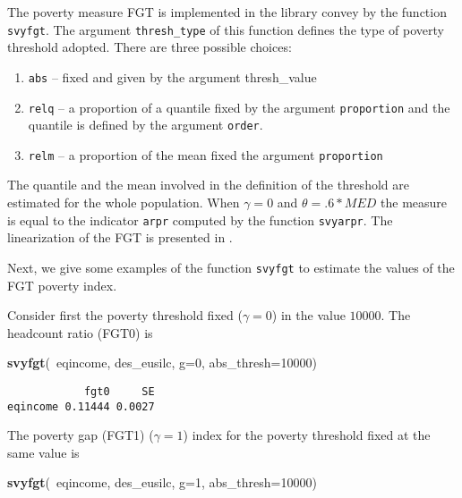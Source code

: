 \documentclass[]{book}
\newenvironment{Shaded}{\begin{snugshade}}{\end{snugshade}}
\newcommand{\KeywordTok}[1]{\textcolor[rgb]{0.13,0.29,0.53}{\textbf{{#1}}}}
\newcommand{\DataTypeTok}[1]{\textcolor[rgb]{0.13,0.29,0.53}{{#1}}}
\newcommand{\DecValTok}[1]{\textcolor[rgb]{0.00,0.00,0.81}{{#1}}}
\newcommand{\NormalTok}[1]{{#1}}
\providecommand{\tightlist}{%
  \setlength{\itemsep}{0pt}\setlength{\parskip}{0pt}}
\theoremstyle{definition}
\theoremstyle{definition}
\theoremstyle{remark}
\begin{document}
The poverty measure FGT is implemented in the library convey by the
function \texttt{svyfgt}. The argument \texttt{thresh\_type} of this
function defines the type of poverty threshold adopted. There are three
possible choices:

\begin{enumerate}
\def\labelenumi{\arabic{enumi}.}
\tightlist
\item
  \texttt{abs} -- fixed and given by the argument thresh\_value
\item
  \texttt{relq} -- a proportion of a quantile fixed by the argument
  \texttt{proportion} and the quantile is defined by the argument
  \texttt{order}.
\item
  \texttt{relm} -- a proportion of the mean fixed the argument
  \texttt{proportion}
\end{enumerate}

The quantile and the mean involved in the definition of the threshold
are estimated for the whole population. When \(\gamma=0\) and
\(\theta= .6*MED\) the measure is equal to the indicator \texttt{arpr}
computed by the function \texttt{svyarpr}. The linearization of the FGT
is presented in \citep{berger2003}.

Next, we give some examples of the function \texttt{svyfgt} to estimate
the values of the FGT poverty index.

Consider first the poverty threshold fixed (\(\gamma=0\)) in the value
\(10000\). The headcount ratio (FGT0) is

\begin{Shaded}
\begin{Highlighting}[]
\KeywordTok{svyfgt}\NormalTok{(~eqincome, des_eusilc, }\DataTypeTok{g=}\DecValTok{0}\NormalTok{, }\DataTypeTok{abs_thresh=}\DecValTok{10000}\NormalTok{)}
\end{Highlighting}
\end{Shaded}

\begin{verbatim}
            fgt0     SE
eqincome 0.11444 0.0027
\end{verbatim}

The poverty gap (FGT1) (\(\gamma=1\)) index for the poverty threshold
fixed at the same value is

\begin{Shaded}
\begin{Highlighting}[]
\KeywordTok{svyfgt}\NormalTok{(~eqincome, des_eusilc, }\DataTypeTok{g=}\DecValTok{1}\NormalTok{, }\DataTypeTok{abs_thresh=}\DecValTok{10000}\NormalTok{)}
\end{Highlighting}
\end{Shaded}
\end{document}
